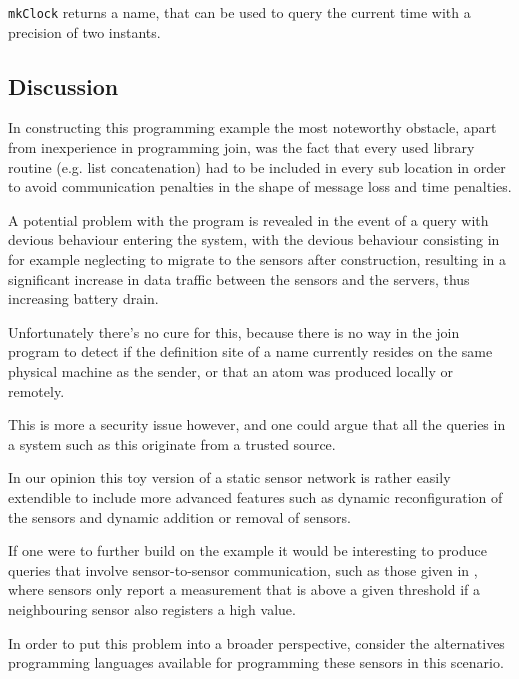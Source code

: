 \texttt{mkClock} returns a name, that can be used to query the current time
with a precision of two instants.


\subsection*{Discussion}

In constructing this programming example the most noteworthy obstacle, apart
from inexperience in programming join, was the fact that every used library
routine (e.g. list concatenation) had to be included in every sub location in
order to avoid communication penalties in the shape of message loss and time
penalties.

A potential problem with the program is revealed in the event of a query with
devious behaviour entering the system, with the devious behaviour consisting in
for example neglecting to migrate to the sensors after construction, resulting
in a significant increase in data traffic between the sensors and the servers,
thus increasing battery drain.

Unfortunately there's no cure for this, because there is no way in the join
program to detect if the definition site of a name currently resides on the same
physical machine as the sender, or that an atom was produced locally or
remotely.

This is more a security issue however, and one could argue that all the queries
in a system such as this originate from a trusted source.

In our opinion this toy version of a static sensor network is rather easily
extendible to include more advanced features such as dynamic reconfiguration of
the sensors and dynamic addition or removal of sensors.

If one were to further build on the example it would be interesting to produce
queries that involve sensor-to-sensor communication, such as those given in
\cite{bonnet2001towards}, where sensors only report a measurement that is above
a given threshold if a neighbouring sensor also registers a high value.

\vspace{1em}

In order to put this problem into a broader perspective, consider the
alternatives programming languages available for programming these sensors in
this scenario.
